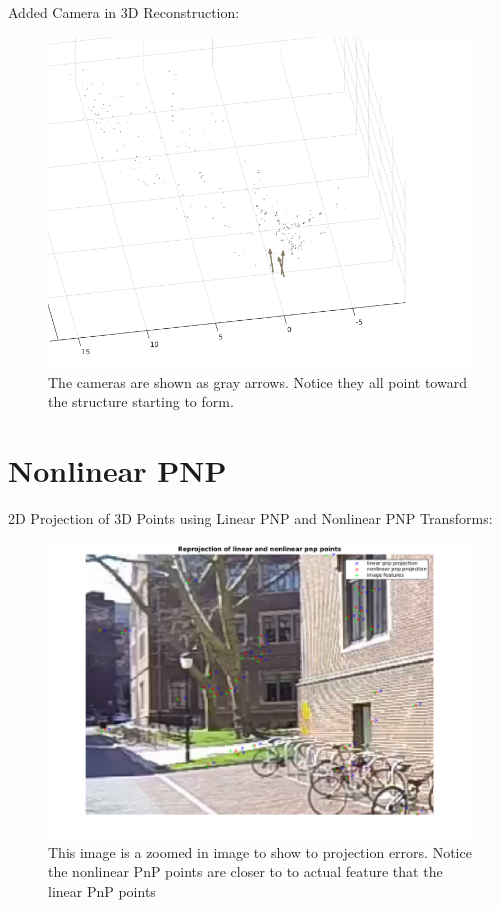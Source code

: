 \documentclass{article}
\begin{document}
Added Camera in 3D Reconstruction:
\begin{figure}[!h]
\includegraphics[width = \textwidth]{3dcampnp.png}
\centering
\caption{The cameras are shown as gray arrows. Notice they all point toward the structure starting to form.}
\end{figure}

\section{Nonlinear PNP}
2D Projection of 3D Points using Linear PNP and Nonlinear PNP Transforms:
\begin{figure}[!h]
\includegraphics[width = \textwidth]{pnp_error_zoom.png}
\centering
\caption{This image is a zoomed in image to show to  projection errors. Notice the nonlinear PnP points are closer to to actual feature that the linear PnP points}
\end{figure}
\end{document}
